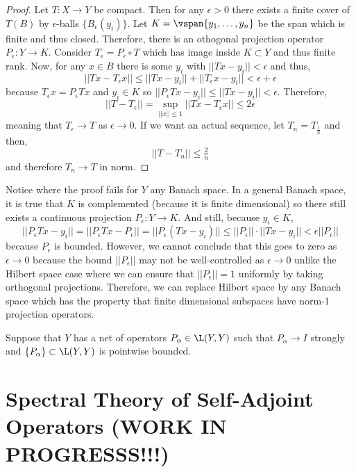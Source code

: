 \documentclass[12pt]{article}
\begin{document}
\begin{proof}
Let $T : X \to Y$ be compact. Then for any $\epsilon > 0$ there exists a finite cover of $T(B)$ by $\epsilon$-balls $\{ B_\epsilon(y_i) \}$. Let $K = \vspan{y_1, \dots, y_n}$ be the span which is finite and thus closed. Therefore, there is an othogonal projection operator $P_\epsilon : Y \to K$. Consider $T_\epsilon = P_\epsilon \circ T$ which has image inside $K \subset Y$ and thus finite rank. Now, for any $x \in B$ there is some $y_i$ with $|| T x - y_i || < \epsilon$ and thus,
\[ || T x - T_\epsilon x || \le || T x - y_i || + || T_\epsilon x - y_i || < \epsilon + \epsilon \]
because $T_\epsilon x = P_\epsilon T x$ and $y_i \in K$ so $|| P_\epsilon T x - y_i || \le || T x - y_i || < \epsilon$. Therefore, 
\[ || T - T_\epsilon || = \sup_{|| x || \le 1} || T x - T_\epsilon x || \le 2 \epsilon \]
meaning that $T_\epsilon \to T$ as $\epsilon \to 0$. If we want an actual sequence, let $T_n = T_{\frac{1}{n}}$ and then,
\[ || T - T_n || \le \tfrac{2}{n} \]
and therefore $T_n \to T$ in norm.
\end{proof}

\begin{rmk}
Notice where the proof fails for $Y$ any Banach space. In a general Banach space, it is true that $K$ is complemented (because it is finite dimensional) so there still exists a continuous projection $P_\epsilon : Y \to K$. And still, because $y_i \in K$,
\[ || P_\epsilon T x - y_i || = || P_\epsilon T x - P_\epsilon || = || P_\epsilon (T x - y_i) || \le || P_\epsilon || \cdot || T x - y_i || < \epsilon || P_\epsilon || \]
because $P_\epsilon$ is bounded. However, we cannot conclude that this goes to zero as $\epsilon \to 0$ because the bound $|| P_\epsilon ||$ may not be well-controlled as $\epsilon \to 0$ unlike the Hilbert space case where we can ensure that $|| P_\epsilon || = 1$ uniformly by taking orthogonal projections. Therefore, we can replace Hilbert space by any Banach space which has the property that finite dimensional subspaces have norm-1 projection operators.
\end{rmk}

\begin{prop}
Suppose that $Y$ has a net of operators $P_\alpha \in \L(Y, Y)$ such that $P_\alpha \to I$ strongly and $\{ P_\alpha \} \subset \L(Y, Y)$ is pointwise bounded.
\end{prop}

\section{Spectral Theory of Self-Adjoint Operators (WORK IN PROGRESSS!!!)}
\end{document}
